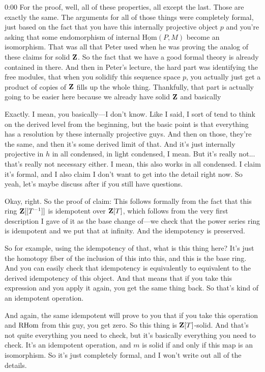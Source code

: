 \begin{unfinished}{0:00}
For the proof, well, all of these properties, all except the last. Those are exactly the same. The arguments for all of those things were completely formal, just based on the fact that you have this internally projective object $p$ and you're asking that some endomorphism of internal $\underline{\text{Hom}}(P,M)$ become an isomorphism. That was all that Peter used when he was proving the analog of these claims for solid $\mathbf Z$. So the fact that we have a good formal theory is already contained in there. And then in Peter's lecture, the hard part was identifying the free modules, that when you solidify this sequence space $p$, you actually just get a product of copies of $\mathbf Z$ fills up the whole thing. Thankfully, that part is actually going to be easier here because we already have solid $\mathbf Z$ and basically

Exactly. I mean, you basically---I don't know. Like I said, I sort of tend to think on the derived level from the beginning, but the basic point is that everything has a resolution by these internally projective guys. And then on those, they're the same, and then it's some derived limit of that. And it's just internally projective in $h$ in all condensed, in light condensed, I mean. But it's really not... that's really not necessary either. I mean, this also works in all condensed. I claim it's formal, and I also claim I don't want to get into the detail right now. So yeah, let's maybe discuss after if you still have questions.

Okay, right. So the proof of claim: This follows formally from the fact that this ring $\mathbf Z[[T^{-1}]]$ is idempotent over $\mathbf Z[T]$, which follows from the very first description I gave of it as the base change of---we check that the power series ring is idempotent and we put that at infinity. And the idempotency is preserved.

So for example, using the idempotency of that, what is this thing here? It's just the homotopy fiber of the inclusion of this into this, and this is the base ring. And you can easily check that idempotency is equivalently to equivalent to the derived idempotency of this object. And that means that if you take this expression and you apply it again, you get the same thing back. So that's kind of an idempotent operation.

And again, the same idempotent will prove to you that if you take this operation and $\operatorname{RHom}$ from this guy, you get zero. So this thing is $\mathbf Z[T]$-solid. And that's not quite everything you need to check, but it's basically everything you need to check. It's an idempotent operation, and $m$ is solid if and only if this map is an isomorphism. So it's just completely formal, and I won't write out all of the details.


\end{unfinished}
